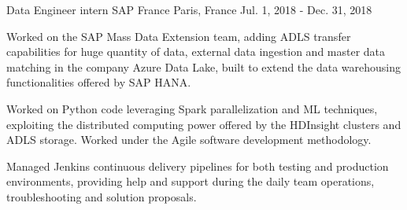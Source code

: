 

\begin{cventries}

  \cventry
    {Data Engineer intern} %
    {SAP France} %
    {Paris, France} %
    {Jul. 1, 2018 - Dec. 31, 2018} %
    {
      \begin{cvitems} %
        \item {Worked on the SAP Mass Data Extension team, adding ADLS transfer capabilities for huge quantity of data, external data ingestion and master data matching in the company Azure Data Lake, built to extend the data warehousing functionalities offered by SAP HANA.}
        \item {Worked on Python code leveraging Spark parallelization and ML techniques, exploiting the distributed computing power offered by the HDInsight clusters and ADLS storage. Worked under the Agile software development methodology.}
        \item {Managed Jenkins continuous delivery pipelines for both testing and production environments, providing help and support during the daily team operations, troubleshooting and solution proposals.}
      \end{cvitems}
    }
\end{cventries}
